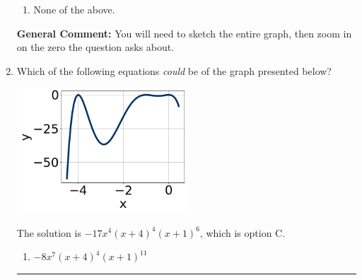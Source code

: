 \documentclass{extbook}[14pt]
\newcommand{\litem}[1]{\item #1

\rule{\textwidth}{0.4pt}}
\begin{document}
\begin{enumerate}
{\begin{enumerate}[label=\Alph*.]
\item None of the above.\end{enumerate}
\textbf{General Comment:} You will need to sketch the entire graph, then zoom in on the zero the question asks about.
}
\litem{
Which of the following equations \textit{could} be of the graph presented below?

\begin{center}
    \includegraphics[width=0.5\textwidth]{../Figures/polyGraphToFunctionCopyA.png}
\end{center}


The solution is \( -17x^{4} (x + 4)^{4} (x + 1)^{6} \), which is option C.\begin{enumerate}[label=\Alph*.]
\item \( -8x^{7} (x + 4)^{4} (x + 1)^{11} \)


\end{enumerate}}
\end{enumerate}
\end{document}

